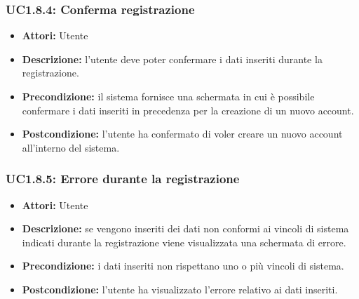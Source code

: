 \subsubsection{UC1.8.4: Conferma registrazione}

\begin{itemize}
    \item \textbf{Attori:} Utente
    \item \textbf{Descrizione:} l'utente deve poter confermare i dati inseriti durante la registrazione.
    \item \textbf{Precondizione:} il sistema fornisce una schermata in cui è possibile confermare i dati inseriti in precedenza per la creazione di un nuovo account.
    \item \textbf{Postcondizione:} l'utente ha confermato di voler creare un nuovo account all'interno
    del sistema.
\end{itemize}

\subsubsection{UC1.8.5: Errore durante la registrazione}

\begin{itemize}
    \item \textbf{Attori:} Utente
    \item \textbf{Descrizione:} se vengono inseriti dei dati non conformi ai vincoli di sistema indicati durante la registrazione viene visualizzata una schermata di errore.
    \item \textbf{Precondizione:} i dati inseriti non rispettano uno o più vincoli di sistema.
    \item \textbf{Postcondizione:} l'utente ha visualizzato l'errore relativo ai dati inseriti.
\end{itemize}
